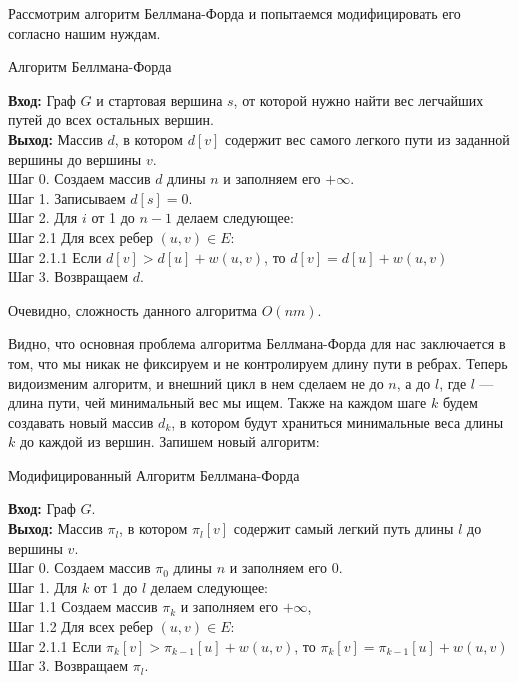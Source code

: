 \documentclass[a4paper,12pt]{extarticle}
\theoremstyle{plain} %
\begin{document}
\begin{large}
 Рассмотрим алгоритм Беллмана-Форда и попытаемся модифицировать его согласно нашим нуждам.

\begin{algorithm}[H]
\caption{Алгоритм Беллмана-Форда}
\label{diff_graph_construct}
\textbf{Вход:} Граф $G$ и стартовая вершина $s$, от которой нужно найти вес легчайших путей до всех остальных вершин.\\
\textbf{Выход:} Массив $d$, в котором $d[v]$ содержит вес самого легкого пути из заданной вершины до вершины $v$.\\
Шаг 0. Создаем массив $d$ длины $n$ и заполняем его $+\infty$. \\
Шаг 1. Записываем $d[s] = 0$.\\
Шаг 2. Для $i$ от 1 до $n-1$ делаем следующее:\\
Шаг 2.1 Для всех ребер $(u, v) \in E:$\\
Шаг 2.1.1 Если $d[v] > d[u] + w(u,v)$, то $d[v] = d[u] + w(u,v)$\\
Шаг 3. Возвращаем $d$.\\
\end{algorithm}

Очевидно, сложность данного алгоритма $O(nm)$.

Видно, что основная проблема алгоритма Беллмана-Форда для нас заключается в том, что мы никак не фиксируем и не контролируем длину пути в ребрах. Теперь видоизменим алгоритм, и внешний цикл в нем сделаем не до $n$, а до $l$, где $l$ --- длина пути, чей минимальный вес мы ищем. Также на каждом шаге $k$ будем создавать новый массив $d_k$, в котором будут храниться минимальные веса длины $k$ до каждой из вершин. Запишем новый алгоритм:

\begin{algorithm}[H]
\caption{Модифицированный Алгоритм Беллмана-Форда}
\label{diff_graph_construct}
\textbf{Вход:} Граф $G$.\\
\textbf{Выход:} Массив $\pi_l$, в котором $\pi_l[v]$ содержит самый легкий путь длины $l$ до вершины $v$.\\
Шаг 0. Создаем массив $\pi_0$ длины $n$ и заполняем его $0$. \\
Шаг 1. Для $k$ от 1 до $l$ делаем следующее:\\
Шаг 1.1 Создаем массив $\pi_k$ и заполняем его $+\infty$,\\
Шаг 1.2 Для всех ребер $(u, v) \in E:$\\
Шаг 2.1.1 Если $\pi_k[v] > \pi_{k-1}[u] + w(u,v)$, то $\pi_k[v] = \pi_{k-1}[u] + w(u,v)$\\
Шаг 3. Возвращаем $\pi_l$.\\
\end{algorithm}


\end{large}
\end{document}
